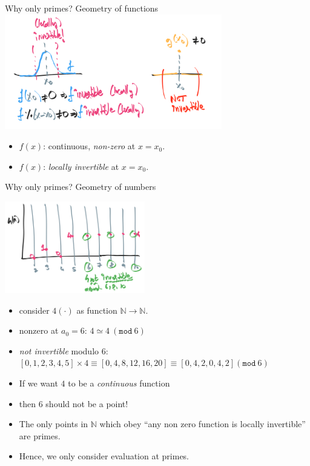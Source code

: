 \documentclass[8pt]{beamer}
\renewcommand{\mod}[1]{\left( \texttt{mod}~#1 \right)}
\newcommand{\N}{\mathbb N}
\begin{document}
\begin{frame}[fragile]{Why only primes? Geometry of functions}
\includegraphics[height=5cm]{./nonzero-fn-locally-invertible.png}\pause
\begin{itemize}
\item $f(x)$: continuous, \emph{non-zero} at $x = x_0$. \pause
\item $f(x)$: \emph{locally invertible} at $x = x_0$. \pause
\end{itemize}
\end{frame}

\begin{frame}[fragile]{Why only primes? Geometry of numbers}

\includegraphics[height=4cm]{./fn-4-on-naturals.png}
\begin{itemize}
\item consider $4(\cdot)$ as function $\mathbb N \rightarrow \mathbb N$. \pause
\item nonzero at $a_0 = 6$: $4 \simeq 4~\mod{6}$\pause
\item \emph{not invertible} modulo $6$: $[0, 1, 2, 3, 4, 5] \times 4 \equiv [0, 4, 8, 12, 16, 20] \equiv [0, 4, 2, 0, 4, 2] \mod{6}$ \pause
\item If we want $4$ to be a \emph{continuous} function\pause
\item then 6 should not be a point!
\item The only points in $\N$ which obey ``any non zero function is locally invertible'' are primes.
\item Hence, we only consider evaluation at primes.
\end{itemize}
\end{frame}
\end{document}
